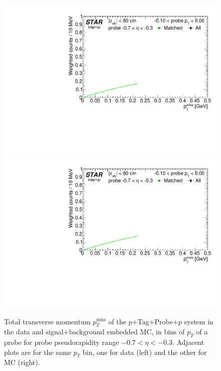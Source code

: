 %
\begin{figure}[h!]
\caption[Tag\&Probe fits to $p_{T}^{\text{miss}}$ in bins of probe $p_{T}$.]{Total transverse momentum $p_{T}^{\text{miss}}$ of the $p$+Tag+Probe+$p$ system in the data and signal+background embedded MC, in bins of $p_{T}$ of a probe for probe pseudorapidity range $-0.7<\eta<-0.3$. Adjacent plots are for the same $p_{T}$ bin, one for data (left) and the other for MC (right).}\label{fig:tagAndProbeTofEffFits_Pt_BinD}
\centering
\parbox{0.24\textwidth}{ 
  \centering
  \includegraphics[width=\linewidth,page=5]{graphics/correctionsToEff/TOF_tagAndProbe/Fitting_effVsPt_data_ETABINS_D.CPT2.pdf}\\
  \includegraphics[width=\linewidth,page=7]{graphics/correctionsToEff/TOF_tagAndProbe/Fitting_effVsPt_data_ETABINS_D.CPT2.pdf}\\
}
\end{figure}
